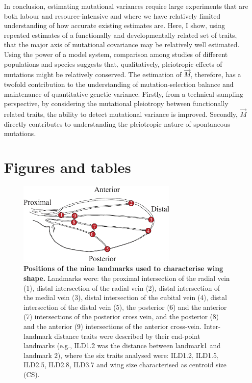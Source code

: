 In conclusion, estimating mutational variances require large experiments that are both labour and resource-intensive and where we have relatively limited understanding of how accurate existing estimates are. Here, I show, using repeated estimates of a functionally and developmentally related set of traits, that the major axis of mutational covariance may be relatively well estimated. Using the power of a model system, comparison among studies of different populations and species suggests that, qualitatively, pleiotropic effects of mutations might be relatively conserved. The estimation of $\vec{M}$, therefore, has a twofold contribution to the understanding of mutation-selection balance and maintenance of quantitative genetic variance. Firstly, from a technical sampling perspective, by considering the mutational pleiotropy between functionally related traits, the ability to detect mutational variance is improved. Secondly, $\vec{M}$ directly contributes to understanding the pleiotropic nature of spontaneous mutations. \par



\onehalfspacing
\newpage
\vspace{-1.5cm}
\section{Figures and tables}
\begin{figure}[hbp]
\centering
\includegraphics[width=0.7\textwidth]{Chp3_Multi/WingNineLM.eps}
\caption[Positions of the nine landmarks used to characterise wing shape.]{\textbf{Positions of the nine landmarks used to characterise wing shape.} Landmarks were: the proximal intersection of the radial vein (1), distal intersection of the radial vein (2), distal intersection of the medial vein (3), distal intersection of the cubital vein (4), distal intersection of the distal vein (5), the posterior (6) and the anterior (7) intersections of the posterior cross vein, and the posterior (8) and the anterior (9) intersections of the anterior cross-vein. Inter-landmark distance traits were described by their end-point landmarks (e.g., ILD1.2 was the distance between landmark1 and landmark 2), where the six traits analysed were: ILD1.2, ILD1.5, ILD2.5, ILD2.8, ILD3.7 and wing size characterised as centroid size (CS).} 
\label{fig:multi_WingNineLM}
\end{figure}
\newpage

